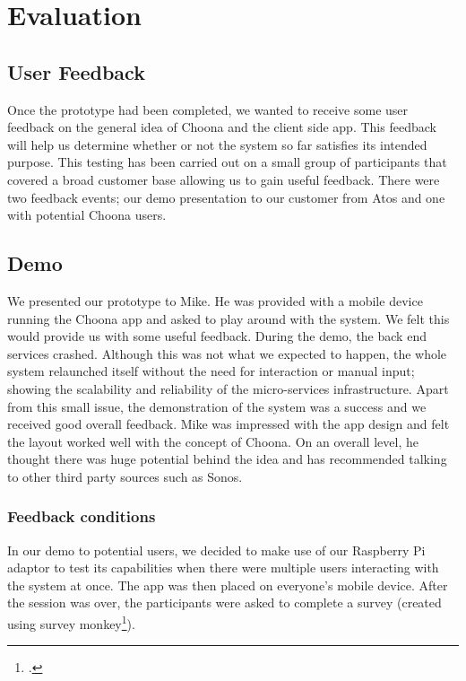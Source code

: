 \section{Evaluation}

\subsection{User Feedback}
Once the prototype had been completed, we wanted to receive some user feedback on the general idea of Choona and the client side app. This feedback will help us determine whether or not the system so far satisfies its intended purpose. This testing has been carried out on a small group of participants that covered a broad customer base allowing us to gain useful feedback.  There were two feedback events; our demo presentation to our customer from Atos and one with potential Choona users.

\subsection{Demo}
We presented our prototype to Mike.  He was provided with a mobile device running the Choona app and asked to play around with the system.  We felt this would provide us with some useful feedback.  During the demo, the back end services crashed.  Although this was not what we expected to happen, the whole system relaunched itself without the need for interaction or manual input; showing the scalability and reliability of the micro-services infrastructure.  Apart from this small issue, the demonstration of the system was a success and we received good overall feedback.  Mike was impressed with the app design and felt the layout worked well with the concept of Choona.  On an overall level, he thought there was huge potential behind the idea and has recommended talking to other third party sources such as Sonos.  

\subsubsection{Feedback conditions}
In our demo to potential users, we decided to make use of our Raspberry Pi adaptor to test its capabilities when there were multiple users interacting with the system at once. The app was then placed on everyone's mobile device. After the session was over, the participants were asked to complete a survey (created using survey monkey\footcite{survey}).

